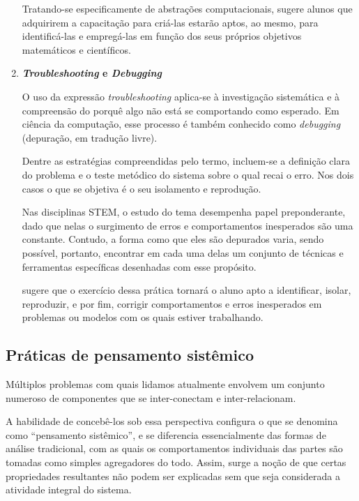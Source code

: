\begin{enumerate}
  Tratando-se especificamente de abstrações computacionais,  sugere alunos que adquirirem a capacitação para criá-las estarão aptos, ao mesmo, para identificá-las e empregá-las em função dos seus próprios objetivos matemáticos e científicos. 

  \item \textbf{\textit{Troubleshooting} e \textit{Debugging}} 
  
  O uso da expressão \textit{troubleshooting} aplica-se à investigação sistemática e à compreensão do porquê algo não está se comportando como esperado. 
  Em ciência da computação, esse processo é também conhecido como \textit{debugging} (depuração, em tradução livre). 

  Dentre as estratégias compreendidas pelo termo, incluem-se a definição clara do problema e o teste metódico do sistema sobre o qual recai o erro. Nos dois casos o que se objetiva é o seu isolamento e reprodução.

  Nas disciplinas STEM, o estudo do tema desempenha papel preponderante, dado que nelas o surgimento de erros e comportamentos inesperados são uma constante. Contudo, a forma como que eles são depurados varia, sendo possível, portanto, encontrar em cada uma delas um conjunto de técnicas e ferramentas específicas desenhadas com esse propósito. 

   sugere que o exercício dessa prática tornará o aluno apto a identificar, isolar, reproduzir, e por fim, corrigir comportamentos e erros inesperados em problemas ou modelos com os quais estiver trabalhando.
\end{enumerate}

\subsection{Práticas de pensamento sistêmico}

Múltiplos problemas com quais lidamos atualmente envolvem um conjunto numeroso de componentes que se inter-conectam e inter-relacionam. 

A habilidade de concebê-los sob essa perspectiva configura o que se denomina como ``pensamento sistêmico'', e se diferencia essencialmente das formas de análise tradicional, com as quais os comportamentos individuais das partes são tomadas como simples agregadores do todo. Assim, surge a noção de que certas propriedades resultantes não podem ser explicadas sem que seja considerada a atividade integral do sistema. 

